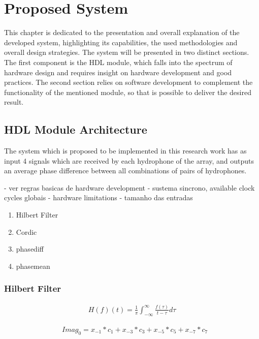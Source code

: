 \chapter{Proposed System} \label{chap:proposed_sys}

This chapter is dedicated to the presentation and overall explanation of the developed system, highlighting its capabilities, the used methodologies and overall design strategies. 
The system will be presented in two distinct sections. The first component is the HDL module, which falls into the spectrum of hardware design and requires insight on hardware development and good practices. The second section relies on software development to complement the functionality of the mentioned module, so that is possible to deliver the desired result.

\section{HDL Module Architecture} \label{subsec:HDL module}

The system which is proposed to be implemented in this research work has as input 4 signals which are received by each hydrophone of the array, and outputs an average phase difference between all combinations of pairs of hydrophones. 

- ver regras basicas de hardware development
- sustema sincrono, available clock cycles globais
- hardware limitations
- tamanho das entradas


\begin{enumerate}
	\item Hilbert Filter
	\item Cordic
	\item phasediff
	\item phasemean
\end{enumerate}

\subsection{Hilbert Filter}


\begin{eqnarray}
H(f)(t) = \frac{1}{\pi}\int_{-\infty}^{\infty}\frac{f(\tau)}{t-\tau}d\tau
\label{eq:hilbert_integral}
\end{eqnarray}

\begin{eqnarray}
&Imag_0 = x_{-1}*c_1 + x_{-3}*c_3 + x_{-5}*c_5 + x_{-7}*c_7
\label{eq:hilbert_imeq}
\end{eqnarray}


